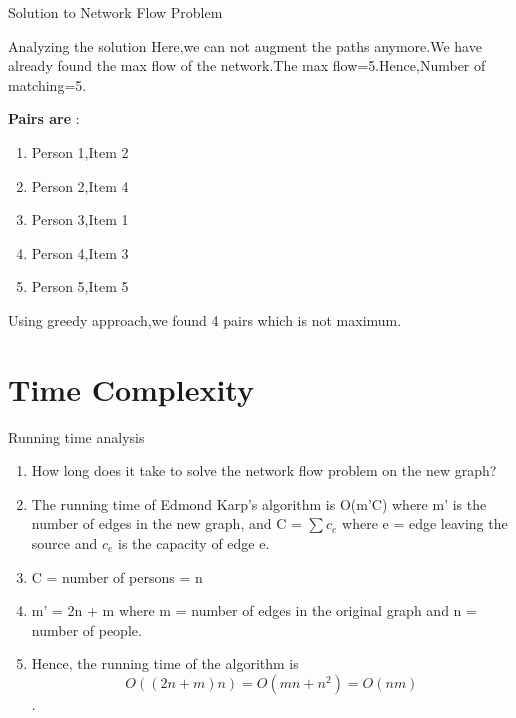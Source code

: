 \documentclass{beamer}
\begin{document}
\begin{frame}{Solution to Network Flow Problem}
\begin{tikzpicture}
            
            

        \end{tikzpicture}

    
    
\end{frame}
\begin{frame}{Analyzing the solution}
            Here,we can not augment the paths anymore.We have already found the max flow of the network.The max flow=5.Hence,Number of matching=5.
        
        \textbf{Pairs are} : 
        \begin{enumerate}
            \item Person 1,Item 2
            \pause
            \item Person 2,Item 4
            \pause
            \item Person 3,Item 1
            \pause
            \item Person 4,Item 3
            \pause
            \item Person 5,Item 5
        \end{enumerate}
        \pause
        Using greedy approach,we found 4 pairs which is not maximum.
\end{frame}

\section{Time Complexity}
\begin{frame}{Running time analysis}
\begin{enumerate}
  \item<1-> How long does it take to solve the network flow problem on the new graph?
  \pause
  \item<2-> The running time of Edmond Karp's algorithm is O(m'C) where m' is
  the number of edges in the new graph, and C = $\sum c_{e}$ where e = edge leaving the source and $c_{e}$ is the capacity of edge e.
  \pause
  \item<3-> C =  number of persons  = n

  \pause
  \item<4-> m' = 2n + m where m = number of edges in the original graph and n = number of people.
  \pause
  \item <5-> Hence, the running time of the algorithm is $$ O((2n + m)n) = O(mn + n^{2}) = O(nm) $$.
\end{enumerate}

\end{frame}
\end{document}
